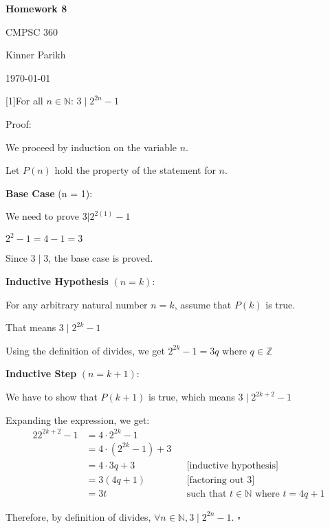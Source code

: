 \documentclass{article} %
\newcommand{\question}[2][]{\begin{flushleft}
        \textbf{Question #1}: #2

\end{flushleft}}
\newcommand{\maketitletwo}[2][]{\begin{center}
        \Large{\textbf{Homework #1}
            
            CMPSC 360} %
        \vspace{5pt}
        
        \normalsize{Kinner Parikh  %
        
        \today}        %
        \vspace{15pt}
        
\end{center}}
\begin{document}
    \maketitletwo[8]  %

    
    \question[1]{For all $n \in \mathbb{N}$: $3 \mid 2^{2n} - 1$}

    Proof:

    We proceed by induction on the variable $n$.
    
    Let $P(n)$ hold the property of the statement for $n$.

    \textbf{Base Case} (n = 1):

    We need to prove $3 | 2^{2(1)} - 1$

    $2 ^ 2 - 1 = 4 - 1 = 3$

    Since $3 \mid 3$, the base case is proved.

    \textbf{Inductive Hypothesis} $(n = k)$:

    For any arbitrary natural number $n = k$, assume that $P(k)$ is true.

    That means $3 \mid 2^{2k} - 1$

    Using the definition of divides, we get $2^{2k} - 1 = 3q$ where $q \in \mathbb{Z}$

    \textbf{Inductive Step} $(n = k + 1)$:

    We have to show that $P(k + 1)$ is true, which means $3 \mid 2^{2k + 2} - 1$

    Expanding the expression, we get:
    \begin{alignat*}{2}
        2^{2k + 2} - 1 &= 4 \cdot 2^{2k} - 1 \\
        &= 4 \cdot (2^{2k} - 1) + 3 \\
        &= 4 \cdot 3q + 3 && \text{[inductive hypothesis]}\\
        &= 3(4q + 1) && \text{[factoring out 3]}\\
        &= 3t && \text{such that $t \in \mathbb{N}$ where $t = 4q + 1$}
    \end{alignat*}

    Therefore, by definition of divides, $\forall n \in \mathbb{N}, 3 \mid 2^{2n} - 1$. $\square$

    \newpage
\end{document}
